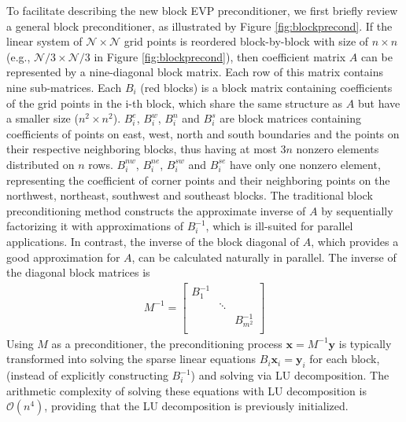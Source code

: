 To facilitate describing the new block EVP preconditioner, we first
briefly review a general block preconditioner, as illustrated by Figure
\ref{fig:blockprecond}.  If the linear system of $\mathcal{N} \times
\mathcal{N}$ grid points is reordered block-by-block with size of $n\times n$
(e.g., $\mathcal{N}/3\times \mathcal{N}/3$ in
Figure \ref{fig:blockprecond}), then coefficient matrix $A$ can be
represented by a nine-diagonal block matrix.
Each row of this matrix contains nine sub-matrices.
Each $B_i$ (red blocks) is a block matrix containing coefficients of
the grid points in the i-th block, which share the same structure as $A$ but
have a smaller size ($n^2\times n^2$).  $B_i^e$, $B_i^w$, $B_i^n$ and
$B_i^s$ are block matrices containing coefficients of points
on east, west, north and south boundaries and the points on their
respective neighboring blocks, thus having at most $3n$ nonzero
elements distributed on $n$ rows. $B_i^{nw}$, $B_i^{ne}$, $B_i^{sw}$
and $B_i^{se}$ have only one nonzero element, representing the
coefficient of corner points and their neighboring points on the
northwest, northeast, southwest and southeast blocks.  The traditional
block preconditioning method constructs the approximate inverse of $A$
by sequentially factorizing it with approximations of $B_i^{-1}$,
which is ill-suited for parallel applications.  In contrast, the
inverse of the block diagonal of $A$, which provides a good
approximation for $A$, can be calculated naturally in parallel.  The
inverse of the diagonal block matrices is
\begin{eqnarray*}
M^{-1}=    \left [
        \begin{array}{ccccccc}
        B_1^{-1} &   &  \\
         & \ddots&  \\
        &   &  B_{m^2}^{-1} \\
    \end{array}
    \right ]
\end{eqnarray*}
Using $M$ as a preconditioner, the preconditioning process $\textbf{x}
= M^{-1}\textbf{y}$ is typically transformed into solving the sparse
linear equations $B_i \textbf{x}_i = \textbf{y}_i$ for each block,
(instead of explicitly constructing $B_i^{-1}$) and solving via LU decomposition.
The arithmetic complexity of solving these equations with LU decomposition is $\mathcal{O}(n^4)$,
providing that the LU decomposition is previously initialized.



